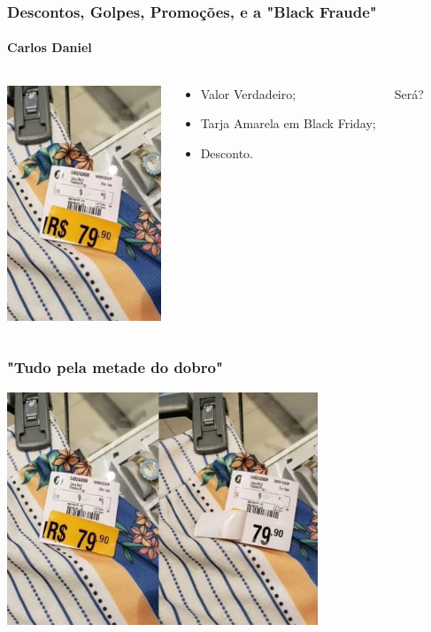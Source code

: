 \documentclass[compress,12pt]{beamer}
\begin{document}

\begin{frame}
    \frametitle{Descontos, Golpes, Promoções, e a "Black Fraude"}
    \framesubtitle{Carlos Daniel}
    \centering
        \begin{columns}
        
            \centering
            
            \includegraphics[width=46mm]{Imagens/blackfraude2.png}
            
            \centering
            
            \begin{block}{}
                \begin{itemize}
                    \item Valor Verdadeiro;
                    \item Tarja Amarela em Black Friday;
                    \item Desconto.
                \end{itemize}
            \end{block}
            Será?
            
        \end{columns}
\end{frame}

\begin{frame}
    \frametitle{"Tudo pela metade do dobro"}
    \centering
    \includegraphics[width=93mm]{Imagens/blackfraude.jpg}
\end{frame}
\end{document}
